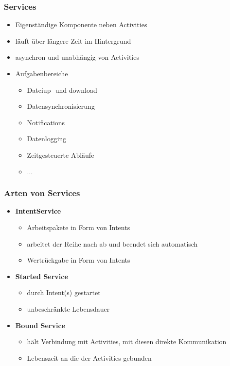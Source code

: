 \begin{frame}[c]
	\frametitle{Services}
	\begin{itemize}
	\item Eigenständige Komponente neben Activities \pause
	\item läuft über längere Zeit im Hintergrund \pause
	\item asynchron und unabhängig von Activities \pause
	\item Aufgabenbereiche
		\begin{itemize}
		\item Dateiup- und download \pause
		\item Datensynchronisierung \pause
		\item Notifications \pause
		\item Datenlogging \pause
		\item Zeitgesteuerte Abläufe
		\item ...
		\end{itemize}
	\end{itemize}
\end{frame}

\begin{frame}[t]
	\frametitle{Arten von Services}
	\begin{itemize}
	\item \textbf{IntentService}
		\begin{itemize}
		\item Arbeitspakete in Form von Intents \pause
		\item arbeitet der Reihe nach ab und beendet sich automatisch \pause
		\item Wertrückgabe in Form von Intents \pause
		\end{itemize}

	\item \textbf{Started Service}
		\begin{itemize}
		\item durch Intent(s) gestartet \pause
		\item unbeschränkte Lebensdauer \pause
		\end{itemize}

	\item \textbf{Bound Service}
		\begin{itemize}
		\item hält Verbindung mit Activities, mit diesen direkte Kommunikation \pause
		\item Lebenszeit an die der Activities gebunden
		\end{itemize}
	\end{itemize}
\end{frame}

